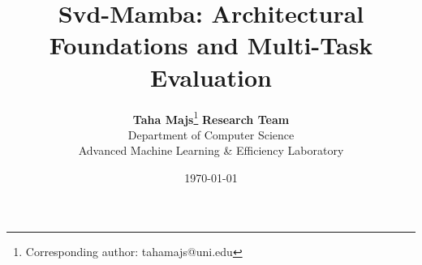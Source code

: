 \title{\textbf{Svd-Mamba: Architectural Foundations and Multi-Task Evaluation}}

\author{
  \textbf{Taha Majs}\thanks{Corresponding author: tahamajs@uni.edu} \quad \textbf{Research Team} \\
  Department of Computer Science \\
  Advanced Machine Learning \& Efficiency Laboratory
}

\date{\today}
